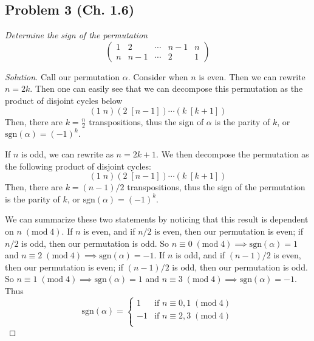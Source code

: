 \documentclass{article}
\begin{document}
\subsection*{Problem 3 (Ch. 1.6)}
{\it Determine the sign of the permutation
\[
	\begin{pmatrix}
		1 & 2 & \cdots & n-1 & n\\
		n & n-1 & \cdots & 2 & 1
	\end{pmatrix}
\]}
\begin{proof}[Solution]\let\qed\relax
	Call our permutation $\alpha$.
	Consider when $n$ is even.
	Then we can rewrite $n = 2k$.
	Then one can easily see that we can decompose this permutation
	as the product of disjoint cycles below
	\[
		(1\;n)(2\;[n-1]) \cdots (k\;\left[k+1\right])
	\]
	Then, there are $k = \frac{n}{2}$ transpositions,
	thus the sign of $\alpha$ is the parity of $k$,
	or $\mathrm{sgn}(\alpha) = (-1)^k$.

	If $n$ is odd,
	we can rewrite as $n = 2k + 1$.
	We then decompose the permutation as the following product of disjoint cycles:
	\[
		(1\;n)(2\;[n-1]) \cdots
		(k\;[k+1])
	\]
	Then, there are $k = (n-1)/2$ transpositions,
	thus the sign of the permutation is the parity of $k$,
	or $\mathrm{sgn}(\alpha) = (-1)^k$.

	We can summarize these two statements by noticing that this result is dependent on $n \;(\mathrm{mod}\; 4)$.
	If $n$ is even, and if $n/2$ is even, then our permutation is even;
	if $n/2$ is odd, then our permutation is odd.
	So $n \equiv 0 \; (\mathrm{mod} \; 4) \implies \mathrm{sgn}(\alpha) = 1$
	and $n \equiv 2 \; (\mathrm{mod} \; 4) \implies \mathrm{sgn}(\alpha) = -1$.
	If $n$ is odd, and if $(n-1)/2$ is even, then our permutation is even;
	if $(n-1)/2$ is odd, then our permutation is odd.
	So $n \equiv 1 \; (\mathrm{mod} \; 4) \implies \mathrm{sgn}(\alpha) = 1$
	and $n \equiv 3 \; (\mathrm{mod} \; 4) \implies \mathrm{sgn}(\alpha) = -1$.
	Thus
	\[
		\mathrm{sgn}(\alpha) = 
		\begin{cases}
			1 &\text{if }n \equiv 0,1 \; (\mathrm{mod} \; 4)\\ 
			-1 &\text{if }n \equiv 2,3 \; (\mathrm{mod} \; 4)\\ 
		\end{cases}
	\]
\end{proof}
\end{document}
